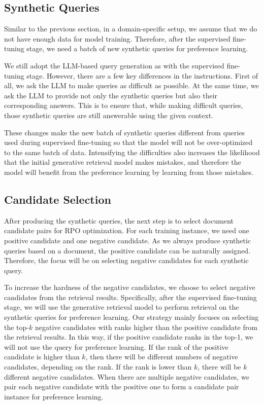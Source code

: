 \subsection{Synthetic Queries}
Similar to the previous section, in a domain-specific setup, we assume that we do not have enough data for model training. Therefore, after the supervised fine-tuning stage, we need a batch of new synthetic queries for preference learning.

We still adopt the LLM-based query generation as with the supervised fine-tuning stage. However, there are a few key differences in the instructions. First of all, we ask the LLM to make queries as difficult as possible. At the same time, we ask the LLM to provide not only the synthetic queries but also their corresponding answers. This is to ensure that, while making difficult queries, those synthetic queries are still answerable using the given context.

These changes make the new batch of synthetic queries different from queries used during supervised fine-tuning so that the model will not be over-optimized to the same batch of data. Intensifying the difficulties also increases the likelihood that the initial generative retrieval model makes mistakes, and therefore the model will benefit from the preference learning by learning from those mistakes.

\subsection{Candidate Selection}
After producing the synthetic queries, the next step is to select document candidate pairs for RPO optimization. For each training instance, we need one positive candidate and one negative candidate. As we always produce synthetic queries based on a document, the positive candidate can be naturally assigned. Therefore, the focus will be on selecting negative candidates for each synthetic query.

To increase the hardness of the negative candidates, we choose to select negative candidates from the retrieval results. Specifically, after the supervised fine-tuning stage, we will use the generative retrieval model to perform retrieval on the synthetic queries for preference learning. Our strategy mainly focuses on selecting the top-$k$ negative candidates with ranks higher than the positive candidate from the retrieval results. In this way, if the positive candidate ranks in the top-1, we will not use the query for preference learning. If the rank of the positive candidate is higher than $k$, then there will be different numbers of negative candidates, depending on the rank. If the rank is lower than $k$, there will be $k$ different negative candidates. When there are multiple negative candidates, we pair each negative candidate with the positive one to form a candidate pair instance for preference learning.

